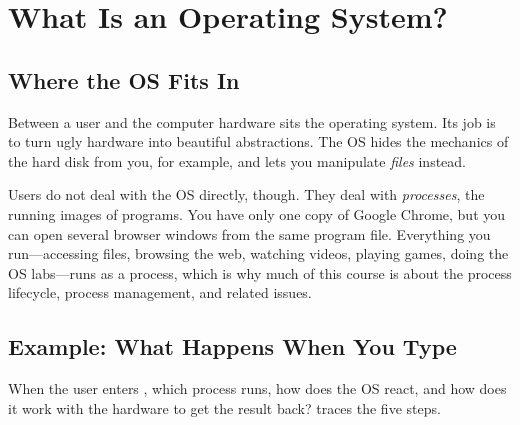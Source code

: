 \section{What Is an Operating System?}
\label{sec:what-os}

\subsection{Where the OS Fits In}

Between a user and the computer hardware sits the operating system. Its job is to turn ugly hardware into beautiful abstractions. The OS hides the mechanics of the hard disk from you, for example, and lets you manipulate \emph{files} instead.

Users do not deal with the OS directly, though. They deal with \emph{processes}, the running images of programs. You have only one copy of Google Chrome, but you can open several browser windows from the same program file. Everything you run---accessing files, browsing the web, watching videos, playing games, doing the OS labs---runs as a process, which is why much of this course is about the process lifecycle, process management, and related issues.

\subsection{Example: What Happens When You Type \texorpdfstring{}{ls}}

When the user enters , which process runs, how does the OS react, and how does it work with the hardware to get the result back?  traces the five steps.


